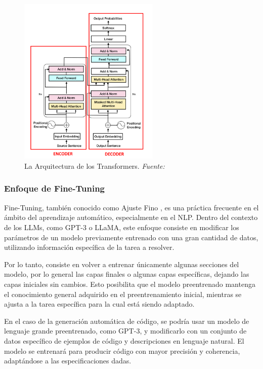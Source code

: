 \begin{figure}[!htb]
  \centering
  \includegraphics[width=0.60\textwidth]{imaxes/2_Transformer.png}
  \caption[La Arquitectura de los Transformers]{La Arquitectura de los Transformers. \textit{Fuente: \cite{vaswani2023attention}}}
  \label{fig:2_Transformer}
\end{figure}


\newpage
\subsubsection{Enfoque de Fine-Tuning}
\label{subsubsec:enfoquefinetuning}

Fine-Tuning, también conocido como Ajuste Fino \cite{IBM_Fine}, es una práctica frecuente en el ámbito del aprendizaje automático, especialmente en el \acrshort{NLP}. Dentro del contexto de los \acrshort{LLMs}, como \acrshort{GPT}-3 o \acrshort{LLaMA}, este enfoque consiste en modificar los parámetros de un modelo previamente entrenado con una gran cantidad de datos, utilizando información específica de la tarea a resolver.

Por lo tanto, consiste en volver a entrenar únicamente algunas secciones del modelo, por lo general las capas finales o algunas capas específicas, dejando las capas iniciales sin cambios. Esto posibilita que el modelo preentrenado mantenga el conocimiento general adquirido en el preentrenamiento inicial, mientras se ajusta a la tarea específica para la cual está siendo adaptado.

En el caso de la generación automática de código, se podría usar un modelo de lenguaje grande preentrenado, como \acrshort{GPT}-3, y modificarlo con un conjunto de datos específico de ejemplos de código y descripciones en lenguaje natural. El modelo se entrenará para producir código con mayor precisión y coherencia, adaptándose a las especificaciones dadas.

